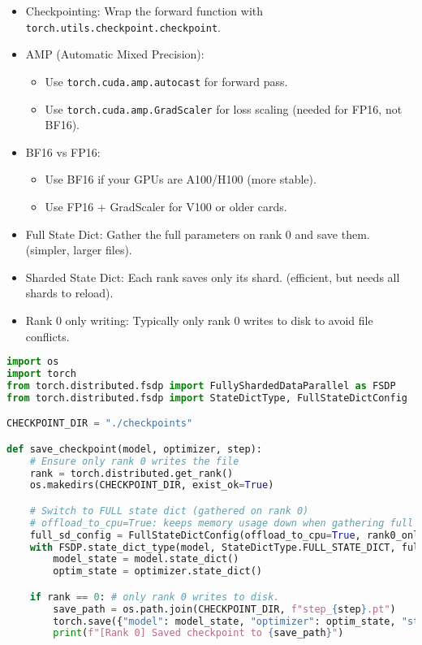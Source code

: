 \begin{itemize}
	\item Checkpointing: Wrap the forward function with \texttt{torch.utils.checkpoint.checkpoint}.
	\item AMP (Automatic Mixed Precision):
		\begin{itemize}
			\item Use \texttt{torch.cuda.amp.autocast} for forward pass.
			\item Use \texttt{torch.cuda.amp.GradScaler} for loss scaling (needed for FP16, not BF16).
		\end{itemize}
	\item BF16 vs FP16:
		\begin{itemize}
			\item Use BF16 if your GPUs are A100/H100 (more stable).
			\item Use FP16 + GradScaler for V100 or older cards.
		\end{itemize}
\end{itemize}


\begin{itemize}
	\item Full State Dict: Gather the full parameters on rank 0 and save them. (simpler, larger files).
	\item Sharded State Dict: Each rank saves only its shard. (efficient, but needs all shards to reload).
	\item Rank 0 only writing: Typically only rank 0 writes to disk to avoid file conflicts.
\end{itemize}
\begin{lstlisting}[language=Python]
import os
import torch
from torch.distributed.fsdp import FullyShardedDataParallel as FSDP
from torch.distributed.fsdp import StateDictType, FullStateDictConfig

CHECKPOINT_DIR = "./checkpoints"

def save_checkpoint(model, optimizer, step):
    # Ensure only rank 0 writes the file
    rank = torch.distributed.get_rank()
    os.makedirs(CHECKPOINT_DIR, exist_ok=True)

    # Switch to FULL state dict (gathered on rank 0)
	# offload_to_cpu=True: keeps memory usage down when gathering full state.
    full_sd_config = FullStateDictConfig(offload_to_cpu=True, rank0_only=True)
    with FSDP.state_dict_type(model, StateDictType.FULL_STATE_DICT, full_sd_config):
        model_state = model.state_dict()
        optim_state = optimizer.state_dict()

    if rank == 0: # only rank 0 writes to disk.
        save_path = os.path.join(CHECKPOINT_DIR, f"step_{step}.pt")
        torch.save({"model": model_state, "optimizer": optim_state, "step": step}, save_path)
        print(f"[Rank 0] Saved checkpoint to {save_path}")
\end{lstlisting}

